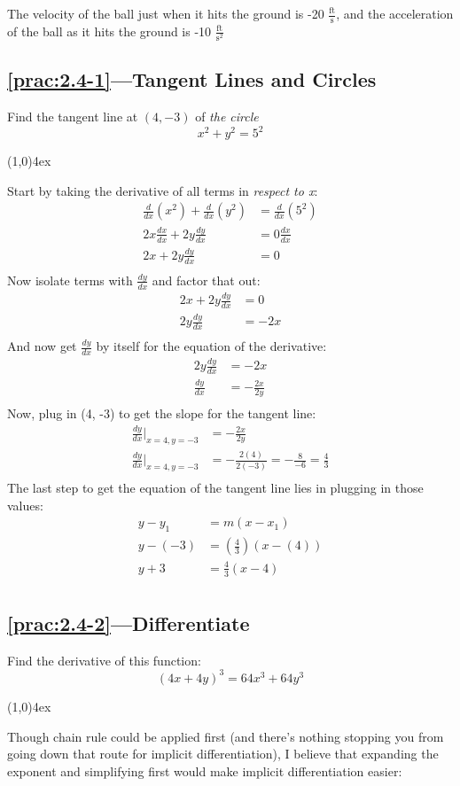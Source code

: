 \documentclass{MathNotes}
\newcommand{\br}{
\begin{center}
\line(1,0){4ex}
\end{center}}
\begin{document}
The velocity of the ball just when it hits the ground is -20 
$\displaystyle\frac{\text{ft}}{\text{s}}$, and the acceleration of the ball as 
it hits the ground is -10 $\frac{\text{ft}}{\text{s}^2}$

\newpage
\subsection*{\ref{prac:2.4-1}---Tangent Lines and Circles}\label{ans:2.4-1}
Find the tangent line at $(4,-3)$ of \textit{the circle}
$$x^2+y^2=5^2$$
\br
Start by taking the derivative of all terms in \textit{respect to x}:
\begin{align*}
    \frac{d}{dx}(x^2)+\frac{d}{dx}(y^2)&=\frac{d}{dx}(5^2)\\
    2x\frac{dx}{dx}+2y\frac{dy}{dx}&=0\frac{dx}{dx}\\
    2x+2y\frac{dy}{dx}&=0\\
\end{align*}
Now isolate terms with $\frac{dy}{dx}$ and factor that out:
\begin{align*}
    2x+2y\frac{dy}{dx}&=0\\
    2y\frac{dy}{dx}&=-2x\\
\end{align*}
And now get $\frac{dy}{dx}$ by itself for the equation of the derivative:
\begin{align*}
    2y\frac{dy}{dx}&=-2x\\
    \frac{dy}{dx}&=-\frac{2x}{2y}\\
\end{align*}
Now, plug in (4, -3) to get the slope for the tangent line:
\begin{align*}
    \frac{dy}{dx}\Big|_{x=4,y=-3}&=-\frac{2x}{2y}\\
    \frac{dy}{dx}\Big|_{x=4,y=-3}&=-\frac{2(4)}{2(-3)}=-\frac{8}{-6}=\frac{4}{3}\\
\end{align*}
The last step to get the equation of the tangent line lies in plugging in those
values:
\begin{align*}
    y-y_1&=m(x-x_1)\\
    y-(-3)&=(\frac{4}{3})(x-(4))\\
    y+3&=\frac{4}{3}(x-4)\\
\end{align*}

\newpage
\subsection*{\ref{prac:2.4-2}---Differentiate}\label{ans:2.4-2}
Find the derivative of this function: $$(4x+4y)^3=64x^3+64y^3$$
\br
Though chain rule could be applied first (and there's nothing stopping you from
going down that route for implicit differentiation), I believe that expanding
the exponent and simplifying first would make implicit differentiation easier:
\end{document}
